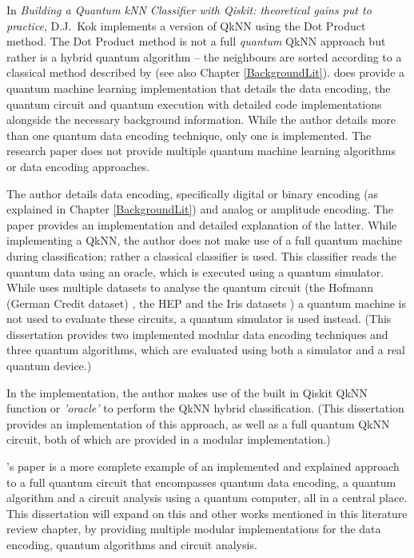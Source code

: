 In \citep{INGKOK}\emph{ Building a Quantum kNN Classifier with Qiskit: theoretical gains put to practice}, D.J.~Kok implements a version of QkNN using the Dot Product method. The Dot Product method is not a full \emph{quantum} QkNN approach but rather is a hybrid quantum algorithm -- the neighbours are sorted according to a classical method described by \citep{Afham2020} (see also Chapter \ref{BackgroundLit}). \citeauthor{INGKOK} does provide a quantum machine learning implementation that details the data encoding, the quantum circuit and quantum execution with detailed code implementations alongside the necessary background information. While the author details more than one quantum data  encoding technique, only one is implemented. The research paper does not provide multiple quantum machine learning algorithms or data encoding approaches.

The author details data encoding, specifically digital or binary encoding (as explained in Chapter \ref{BackgroundLit}) and analog or amplitude encoding. The paper provides an implementation and detailed explanation of the latter. While implementing a QkNN, the author does not make use of a full quantum machine during classification; rather a classical classifier is used. This classifier reads the quantum data using an oracle, which is executed using a quantum simulator. While \citeauthor{INGKOK} uses multiple datasets to analyse the quantum circuit (the Hofmann (German Credit dataset) \citep{hofmanngerman}, the HEP \citep{hepData} and the Iris datasets \citep{irisData}) a quantum machine is not used to evaluate these circuits, a quantum simulator is used instead. (This dissertation provides two implemented modular data encoding techniques and three quantum algorithms, which are evaluated using both a simulator and a real quantum device.)

In the implementation, the author makes use of the built in Qiskit QkNN function or \emph{'oracle'} to perform the QkNN hybrid classification. (This dissertation provides an implementation of this approach, as well as a full quantum QkNN circuit, both of which are provided in a modular implementation.) 

\citeauthor{INGKOK}'s paper is a more complete example of an implemented and explained approach to a full quantum circuit that encompasses quantum data encoding, a quantum algorithm and a circuit analysis using a quantum computer, all in a central place. %
 This dissertation will expand on this and other works mentioned in this literature review chapter, by providing multiple modular implementations for the data encoding, quantum algorithms and circuit analysis.

